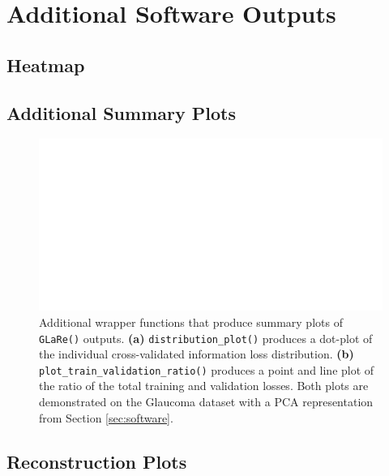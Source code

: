 \section{Additional Software Outputs}\label{sec:additional-outputs}


\subsection{Heatmap}


\subsection{Additional Summary Plots}

\begin{figure}
    \centering
    \includegraphics[width=1\linewidth]{figures/additional-plots-01.pdf}
    \caption{Additional wrapper functions that produce summary plots of \texttt{GLaRe()} outputs. \textbf{(a)} \texttt{distribution\_plot()} produces a dot-plot of the individual cross-validated information loss distribution. \textbf{(b)} \texttt{plot\_train\_validation\_ratio()}
    \label{fig:additional-plots-01} produces a point and line plot of the ratio of the total training and validation losses.
    Both plots are demonstrated on the Glaucoma dataset with a PCA representation from Section \ref{sec:software}.}
\end{figure}

\subsection{Reconstruction Plots}
